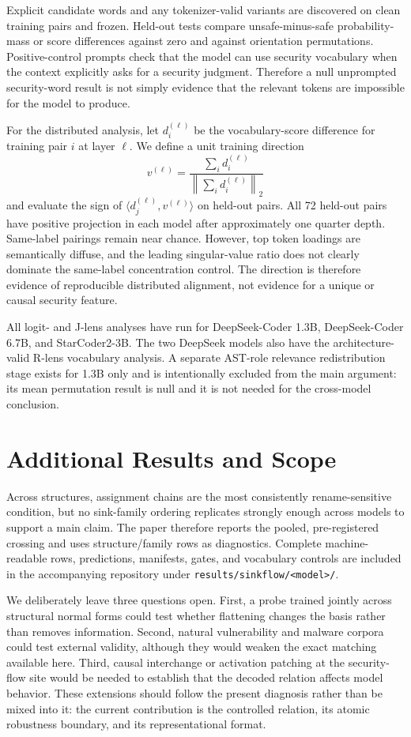 \documentclass{article}
\begin{document}
Explicit candidate words and any tokenizer-valid variants are discovered on clean training pairs and frozen. Held-out tests compare unsafe-minus-safe probability-mass or score differences against zero and against orientation permutations. Positive-control prompts check that the model can use security vocabulary when the context explicitly asks for a security judgment. Therefore a null unprompted security-word result is not simply evidence that the relevant tokens are impossible for the model to produce.

For the distributed analysis, let $d_i^{(\ell)}$ be the vocabulary-score difference for training pair $i$ at layer $\ell$. We define a unit training direction
\[
v^{(\ell)}=\frac{\sum_i d_i^{(\ell)}}{\left\|\sum_i d_i^{(\ell)}\right\|_2}
\]
and evaluate the sign of $\langle d_j^{(\ell)},v^{(\ell)}\rangle$ on held-out pairs. All 72 held-out pairs have positive projection in each model after approximately one quarter depth. Same-label pairings remain near chance. However, top token loadings are semantically diffuse, and the leading singular-value ratio does not clearly dominate the same-label concentration control. The direction is therefore evidence of reproducible distributed alignment, not evidence for a unique or causal security feature.

All logit- and J-lens analyses have run for DeepSeek-Coder 1.3B, DeepSeek-Coder 6.7B, and StarCoder2-3B. The two DeepSeek models also have the architecture-valid R-lens vocabulary analysis. A separate AST-role relevance redistribution stage exists for 1.3B only and is intentionally excluded from the main argument: its mean permutation result is null and it is not needed for the cross-model conclusion.

\section{Additional Results and Scope}\label{app:extra}
Across structures, assignment chains are the most consistently rename-sensitive condition, but no sink-family ordering replicates strongly enough across models to support a main claim. The paper therefore reports the pooled, pre-registered crossing and uses structure/family rows as diagnostics. Complete machine-readable rows, predictions, manifests, gates, and vocabulary controls are included in the accompanying repository under \texttt{results/sinkflow/<model>/}.

We deliberately leave three questions open. First, a probe trained jointly across structural normal forms could test whether flattening changes the basis rather than removes information. Second, natural vulnerability and malware corpora could test external validity, although they would weaken the exact matching available here. Third, causal interchange or activation patching at the security-flow site would be needed to establish that the decoded relation affects model behavior. These extensions should follow the present diagnosis rather than be mixed into it: the current contribution is the controlled relation, its atomic robustness boundary, and its representational format.
\end{document}
